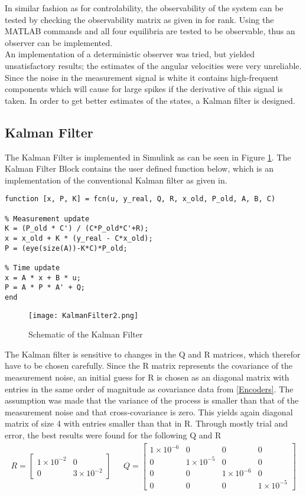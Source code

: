 \documentclass[main.tex]{subfiles}
\begin{document}
	
\vspace{20pt}
In similar fashion as for controlability, the observability of the system can be tested by checking the observability matrix as given in \cite{Controlsystemdesign} for rank. Using the MATLAB\textsuperscript{\textregistered} commands  and  all four equilibria are tested to be observable, thus an observer can be implemented. \\ 
An implementation of a deterministic observer was tried, but yielded unsatisfactory results; the estimates of the angular velocities were very unreliable. Since the noise in the measurement signal is white it contains high-frequent components which will cause for large spikes if the derivative of this signal is taken. In order to get better estimates of the states, a Kalman filter is designed.  

\subsection{Kalman Filter}
The Kalman Filter is implemented in Simulink\textsuperscript{\textregistered} as can be seen in Figure \ref{fig:KalmanFilter}. The Kalman Filter Block contains the user defined function below, which is an implementation of the conventional Kalman filter as given in\cite{Filtering}. 
\begin{lstlisting}
function [x, P, K] = fcn(u, y_real, Q, R, x_old, P_old, A, B, C)

% Measurement update
K = (P_old * C') / (C*P_old*C'+R);
x = x_old + K * (y_real - C*x_old);
P = (eye(size(A))-K*C)*P_old;

% Time update
x = A * x + B * u;
P = A * P * A' + Q;
end
\end{lstlisting}
\begin{figure}[H]
\centering
\texttt{[image: KalmanFilter2.png]}
\caption{\label{fig:KalmanFilter} Schematic of the Kalman Filter}
\end{figure}
The Kalman filter is sensitive to changes in the Q and R matrices, which therefor have to be chosen carefully. Since the R matrix represents the covariance of the measurement noise, an initial guess for R is chosen as an diagonal matrix with entries in the same order of magnitude as covariance data from \ref{Encoders}. The assumption was made that the variance of the process is smaller than that of the measurement noise and that cross-covariance is zero. This yields again diagonal matrix of size 4 with entries smaller than that in R. Through mostly trial and error, the best results were found for the following Q and R
\begin{align*}
R = 
\begin{bmatrix}
1\times10^{-2} &	0 \\ 
0 &	3\times10^{-2}
\end{bmatrix}
& \ \ \ 
Q = 
\begin{bmatrix}
1\times10^{-6} &0&0&0 \\ 
0&1\times10^{-5}&0&0\\
0&0&1\times10^{-6}&0\\
0&0&0&1\times10^{-5}
\end{bmatrix}
\end{align*}
\end{document}
